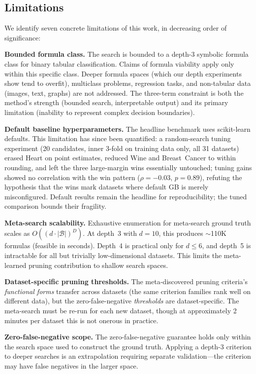 \documentclass[journal]{IEEEtran}
\begin{document}
\subsection{Limitations}
\label{sec:limitations}

We identify seven concrete limitations of this work, in decreasing
order of significance:

\textbf{Bounded formula class.}
The search is bounded to a depth-3 symbolic formula class for binary
tabular classification.  Claims of formula viability apply only
within this specific class.  Deeper formula spaces (which our depth
experiments show tend to overfit), multiclass problems, regression
tasks, and non-tabular data (images, text, graphs) are not
addressed.  The three-term constraint is both the method's strength
(bounded search, interpretable output) and its primary limitation
(inability to represent complex decision boundaries).

\textbf{Default baseline hyperparameters.}
The headline benchmark uses scikit-learn defaults.  This
limitation has since been quantified: a random-search tuning
experiment (20 candidates, inner 3-fold on training data only,
all 31 datasets) erased Heart on point estimates, reduced Wine
and Breast~Cancer to within rounding, and left the three
large-margin wins essentially untouched; tuning gains showed no
correlation with the win pattern
($\rho = -0.03$, $p = 0.89$), refuting the hypothesis that the
wins mark datasets where default GB is merely misconfigured.
Default results remain the headline for reproducibility; the
tuned comparison bounds their fragility.

\textbf{Meta-search scalability.}
Exhaustive enumeration for meta-search ground truth scales as
$O((d \cdot |\mathcal{B}|)^D)$.  At depth~3 with $d = 10$,
this produces $\sim$110K formulas (feasible in seconds).  Depth~4
is practical only for $d \leq 6$, and depth~5 is intractable for
all but trivially low-dimensional datasets.  This limits the
meta-learned pruning contribution to shallow search spaces.

\textbf{Dataset-specific pruning thresholds.}
The meta-discovered pruning criteria's \emph{functional forms}
transfer across datasets (the same criterion families rank well on
different data), but the zero-false-negative \emph{thresholds} are
dataset-specific.  The meta-search must be re-run for each new
dataset, though at approximately 2 minutes per dataset this is
not onerous in practice.

\textbf{Zero-false-negative scope.}
The zero-false-negative guarantee holds only within the search
space used to construct the ground truth.  Applying a depth-3
criterion to deeper searches is an extrapolation requiring separate
validation---the criterion may have false negatives in the larger
space.
\end{document}
